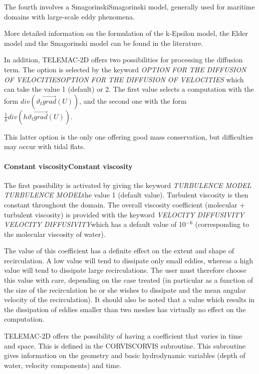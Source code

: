 \documentclass{article} %
\begin{document}
 The fourth involves a SmagorinskiSmagorinski model, generally used for maritime domains with large-scale eddy phenomena.

 More detailed information on the formulation of the k-Epsilon model, the Elder model and the Smagorinski model can be found in the literature.

 In addition, TELEMAC-2D offers two possibilities for processing the diffusion term. The option is selected by the keyword \textit{OPTION FOR THE DIFFUSION OF VELOCITIESOPTION FOR THE DIFFUSION OF VELOCITIES} which can take the value 1 (default) or 2. The first value selects a computation with the form $div\left({\vartheta }_t\overrightarrow{grad}\left(U\right)\right)$, and the second one with the form $\frac{1}{h}div\left({h\vartheta }_t\overrightarrow{grad}\left(U\right)\right)$.

 This latter option is the only one offering good mass conservation, but difficulties may occur with tidal flats.


\paragraph{ Constant viscosityConstant viscosity}

 The first possibility is activated by giving the keyword \textit{TURBULENCE MODEL} \textit{TURBULENCE MODEL}the value 1 (default value). Turbulent viscosity is then constant throughout the domain. The overall viscosity coefficient (molecular + turbulent viscosity) is provided with the keyword \textit{VELOCITY DIFFUSIVITY} \textit{VELOCITY DIFFUSIVITY}which has a default value of 10${}^{-}$${}^{6}$ (corresponding to the molecular viscosity of water).

 The value of this coefficient has a definite effect on the extent and shape of recirculation. A low value will tend to dissipate only small eddies, whereas a high value will tend to dissipate large recirculations. The user must therefore choose this value with care, depending on the case treated (in particular as a function of the size of the recirculation he or she wishes to dissipate and the mean angular velocity of the recirculation). It should also be noted that a value which results in the dissipation of eddies smaller than two meshes has virtually no effect on the computation.

 TELEMAC-2D offers the possibility of having a coefficient that varies in time and space. This is defined in the CORVISCORVIS subroutine. This subroutine gives information on the geometry and basic hydrodynamic variables (depth of water, velocity components) and time.
\end{document}
